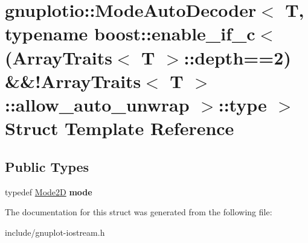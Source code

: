 \hypertarget{structgnuplotio_1_1ModeAutoDecoder_3_01T_00_01typename_01boost_1_1enable__if__c_3_07ArrayTraits_37323ac081238177311f71c094f54a55}{}\section{gnuplotio\+:\+:Mode\+Auto\+Decoder$<$ T, typename boost\+:\+:enable\+\_\+if\+\_\+c$<$(Array\+Traits$<$ T $>$\+:\+:depth==2) \&\&!\+Array\+Traits$<$ T $>$\+:\+:allow\+\_\+auto\+\_\+unwrap $>$\+:\+:type $>$ Struct Template Reference}
\label{structgnuplotio_1_1ModeAutoDecoder_3_01T_00_01typename_01boost_1_1enable__if__c_3_07ArrayTraits_37323ac081238177311f71c094f54a55}
\subsection*{Public Types}
\begin{DoxyCompactItemize}
\item 
\mbox{\label{structgnuplotio_1_1ModeAutoDecoder_3_01T_00_01typename_01boost_1_1enable__if__c_3_07ArrayTraits_37323ac081238177311f71c094f54a55_a4a741dbcbd1404fdfef24420a7867d26}} 
typedef \hyperlink{structgnuplotio_1_1Mode2D}{Mode2D} {\bfseries mode}
\end{DoxyCompactItemize}


The documentation for this struct was generated from the following file\+:\begin{DoxyCompactItemize}
\item 
include/gnuplot-\/iostream.\+h\end{DoxyCompactItemize}
